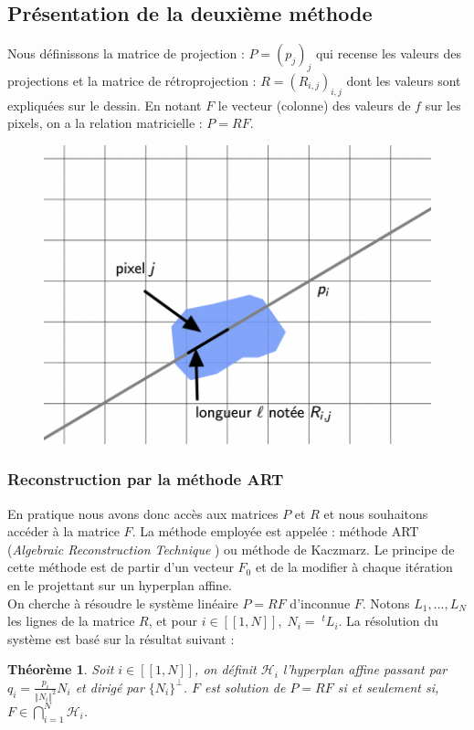 \documentclass{article}
\newcommand*{\iintervalle}[2]{[\![#1,#2]\!]}
\newcommand*{\norme}[1]{\left \Vert #1 \right \Vert}
\theoremstyle{definition}
\theoremstyle{remark}
\theoremstyle{plain}
\newtheorem{theorem}{Théorème}
\theoremstyle{definition}
\begin{document}
\subsection{Présentation de la deuxième méthode}
Nous définissons la matrice de projection : $P = (p_j)_j$ qui recense les valeurs des projections et la matrice de rétroprojection : $R = (R_{i,j})_{i,j}$ dont les valeurs sont expliquées sur le dessin. En notant $F$ le vecteur (colonne) des valeurs 
de $f$ sur les pixels, on a la relation matricielle : $P = RF$.\\
\begin{figure}[h]
    \centering
    \includegraphics[scale = 0.5]{defObj.png}
\end{figure}

\subsubsection*{Reconstruction par la méthode ART}
En pratique nous avons donc accès aux matrices $P$ et $R$ et nous souhaitons accéder à la matrice $F$. La méthode employée est appelée : méthode ART ({\it Algebraic Reconstruction Technique }) ou méthode de Kaczmarz. 
Le principe de cette méthode est de partir d'un vecteur $F_0$ et de la modifier à chaque itération en le projettant sur un hyperplan affine. \\
\noindent On cherche à résoudre le système linéaire $P = RF$ d'inconnue $F$. Notons $L_1, ... , L_N$ les lignes de la matrice $R$, et pour $i \in \iintervalle{1}{N}, \; N_i = \;^t L_i$. La résolution du système est basé sur la résultat suivant :
\begin{theorem}
Soit $i \in \iintervalle{1}{N}$, on définit $\mathcal{H}_i$ l'hyperplan affine passant par $q_i = \frac{p_i}{\norme{N_i}^2}N_i$ et dirigé par $\{N_i\}^{\perp}$. $F$ est solution de $P = RF$ si et seulement si, $F \in \bigcap_{i = 1}^{N} \mathcal{H}_i$.
\end{theorem}
\end{document}
